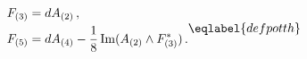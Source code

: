 \begin{equation}
\begin{split}
F_{(3)}&= dA_{(2)}\,,\\
F_{(5)}&= dA_{(4)}-{\frac 18}\,{\rm Im}( A_{(2)}\wedge
F_{(3)}^*)\,.
\end{split}
\eqlabel{defpotth}
\end{equation}


